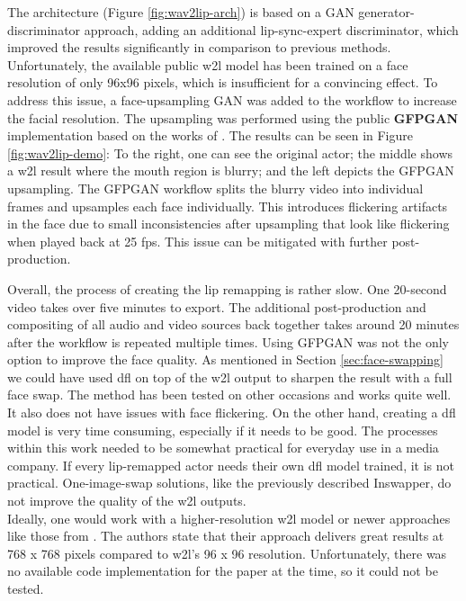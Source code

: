 \documentclass[
  a4paper,  %
  twoside,  %
  bibliography=totoc,
  headsepline,
  cleardoublepage=empty,
  parskip=half,
  draft=false
]{scrbook}
\begin{document}
The architecture (Figure \ref{fig:wav2lip-arch}) is based on a GAN generator-discriminator approach, adding an additional lip-sync-expert discriminator, which improved the results significantly in comparison to previous methods. \\
Unfortunately, the available public \gls{w2l} model has been trained on a face resolution of only 96x96 pixels, which is insufficient for a convincing effect. To address this issue, a face-upsampling GAN was added to the workflow to increase the facial resolution. The upsampling was performed using the public \textbf{GFPGAN} implementation based on the works of \citet{wangNeuralSourcefilterbasedWaveform2019}. The results can be seen in Figure \ref{fig:wav2lip-demo}: To the right, one can see the original actor; the middle shows a \gls{w2l} result where the mouth region is blurry; and the left depicts the GFPGAN upsampling. The GFPGAN workflow splits the blurry video into individual frames and upsamples each face individually. This introduces flickering artifacts in the face due to small inconsistencies after upsampling that look like flickering when played back at 25 \gls{fps}. This issue can be mitigated with further post-production.

Overall, the process of creating the lip remapping is rather slow. One 20-second video takes over five minutes to export. The additional post-production and compositing of all audio and video sources back together takes around 20 minutes after the workflow is repeated multiple times. Using GFPGAN was not the only option to improve the face quality. As mentioned in Section \ref{sec:face-swapping} we could have used \gls{dfl} on top of the \gls{w2l} output to sharpen the result with a full face swap. The method has been tested on other occasions and works quite well. It also does not have issues with face flickering. On the other hand, creating a \gls{dfl} model is very time consuming, especially if it needs to be good. The processes within this work needed to be somewhat practical for everyday use in a media company. If every lip-remapped actor needs their own \gls{dfl} model trained, it is not practical. One-image-swap solutions, like the previously described Inswapper, do not improve the quality of the \gls{w2l} outputs. \\
Ideally, one would work with a higher-resolution \gls{w2l} model or newer approaches like those from \citet{guptaGeneratingUltraHighResolution2023}. The authors state that their approach delivers great results at 768 x 768 pixels compared to \gls{w2l}'s 96 x 96 resolution. Unfortunately, there was no available code implementation for the paper at the time, so it could not be tested.
\end{document}
